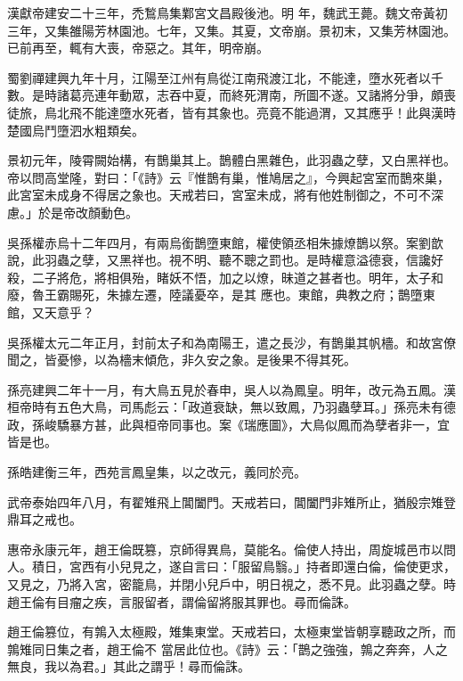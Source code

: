 \begin{pinyinscope}
 漢獻帝建安二十三年，禿鶖鳥集鄴宮文昌殿後池。明
 年，魏武王薨。魏文帝黃初三年，又集雒陽芳林園池。七年，又集。其夏，文帝崩。景初末，又集芳林園池。已前再至，輒有大喪，帝惡之。其年，明帝崩。



 蜀劉禪建興九年十月，江陽至江州有鳥從江南飛渡江北，不能達，墮水死者以千數。是時諸葛亮連年動眾，志吞中夏，而終死渭南，所圖不遂。又諸將分爭，頗喪徒旅，鳥北飛不能達墮水死者，皆有其象也。亮竟不能過渭，又其應乎！此與漢時楚國烏鬥墮泗水粗類矣。



 景初元年，陵霄闕始構，有鵲巢其上。鵲體白黑雜色，此羽蟲之孽，又白黑祥也。帝以問高堂隆，對曰：「《詩》云『惟鵲有巢，惟鳩居之』，今興起宮室而鵲來巢，此宮室未成身不得居之象也。天戒若曰，宮室未成，將有他姓制御之，不可不深慮。」於是帝改顏動色。



 吳孫權赤烏十二年四月，有兩烏銜鵲墮東館，權使領丞相朱據燎鵲以祭。案劉歆說，此羽蟲之孽，又黑祥也。視不明、聽不聰之罰也。是時權意溢德衰，信讒好殺，二子將危，將相俱殆，睹妖不悟，加之以燎，昧道之甚者也。明年，太子和廢，魯王霸賜死，朱據左遷，陸議憂卒，是其
 應也。東館，典教之府；鵲墮東館，又天意乎？



 吳孫權太元二年正月，封前太子和為南陽王，遣之長沙，有鵲巢其帆檣。和故宮僚聞之，皆憂慘，以為檣末傾危，非久安之象。是後果不得其死。



 孫亮建興二年十一月，有大鳥五見於春申，吳人以為鳳皇。明年，改元為五鳳。漢桓帝時有五色大鳥，司馬彪云：「政道衰缺，無以致鳳，乃羽蟲孽耳。」孫亮未有德政，孫峻驕暴方甚，此與桓帝同事也。案《瑞應圖》，大鳥似鳳而為孽者非一，宜皆是也。



 孫皓建衡三年，西苑言鳳皇集，以之改元，義同於亮。



 武帝泰始四年八月，有翟雉飛上閶闔門。天戒若曰，閶闔門非雉所止，猶殷宗雉登鼎耳之戒也。



 惠帝永康元年，趙王倫既篡，京師得異鳥，莫能名。倫使人持出，周旋城邑市以問人。積日，宮西有小兒見之，遂自言曰：「服留鳥翳。」持者即還白倫，倫使更求，又見之，乃將入宮，密籠鳥，并閉小兒戶中，明日視之，悉不見。此羽蟲之孽。時趙王倫有目瘤之疾，言服留者，謂倫留將服其罪也。尋而倫誅。



 趙王倫篡位，有鶉入太極殿，雉集東堂。天戒若曰，太極東堂皆朝享聽政之所，而鶉雉同日集之者，趙王倫不
 當居此位也。《詩》云：「鵲之強強，鶉之奔奔，人之無良，我以為君。」其此之謂乎！尋而倫誅。




\end{pinyinscope}
